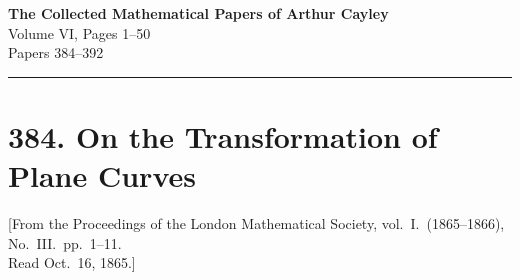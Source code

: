 \documentclass[12pt,a4paper]{article}
\theoremstyle{plain}
\theoremstyle{definition}
\theoremstyle{remark}
\begin{document}
\begin{center}
{\Large\bfseries The Collected Mathematical Papers of Arthur Cayley}\\[0.5em]
{\large Volume VI, Pages 1--50}\\[0.3em]
{\normalsize Papers 384--392}
\end{center}

\hrule
\vspace{1em}

\section*{384. On the Transformation of Plane Curves}

\begin{center}
\small [From the Proceedings of the London Mathematical Society, vol.~I.\ (1865--1866), No.~III.\ pp.~1--11.\\
Read Oct.\ 16, 1865.]
\end{center}
\end{document}
